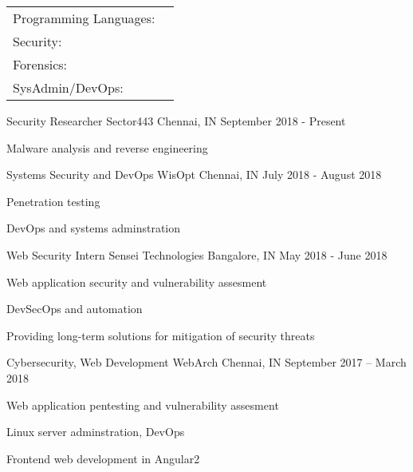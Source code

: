 \documentclass[]{awesome-cv}
\begin{document}
\begin{cventries}
	\cventry
	{}
	{\def\arraystretch{1.15}{\begin{tabular}{ l l }
		Programming Languages:  & {\skill{ Python, Shell, Nim, C, JS, PHP, HTML/CSS}} \\
		Security: & {\skill{ Metasploit Framework, radare2, gdb, Burp Suite }} \\
		Forensics: & {\skill{ Filesystems, The Sleuth Kit, Volatility }} \\
		SysAdmin/DevOps:  & {\skill{ Unix tools/CLI, AWS, Digital Ocean, Git, TravisCI}} \\
		\end{tabular}}}
	{}
	{}
	{}
\end{cventries}


\vspace{-10mm}
\vspace{-3mm}
\begin{cventries}
	\cventry
	{Security Researcher}
	{Sector443}
	{Chennai, IN}
	{September 2018 - Present}
	{\begin{cvitems}
		\item {Malware analysis and reverse engineering}
	\end{cvitems}}
	\cventry
	{Systems Security and DevOps}
	{WisOpt}
	{Chennai, IN}
	{July 2018 - August 2018}
	{\begin{cvitems}
		\item {Penetration testing}
		\item {DevOps and systems adminstration}
	\end{cvitems}}
	\cventry
	{Web Security Intern}
	{Sensei Technologies}
	{Bangalore, IN}
	{May 2018 - June 2018}
	{\begin{cvitems}
		\item {Web application security and vulnerability assesment}
		\item {DevSecOps and automation}
		\item {Providing long-term solutions for mitigation of security threats}
	\end{cvitems}}
	\cventry
	{Cybersecurity, Web Development}
	{WebArch}
	{Chennai, IN}
	{September 2017 – March 2018}
	{\begin{cvitems}
		\item {Web application pentesting and vulnerability assesment}
		\item {Linux server adminstration, DevOps}
		\item {Frontend web development in Angular2}
	\end{cvitems}}
\end{cventries}
\end{document}

